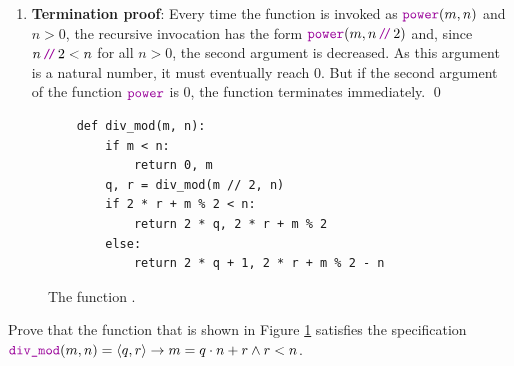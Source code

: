 \begin{enumerate}
\begin{enumerate}
            Then there exists a number $k \in \N$ such that $n = 2 \cdot k + 1$ and we have
            $n \dv 2 = k$.  In this case we have:
            \\[0.2cm]
            \hspace*{1.3cm}
            $ 
            \begin{array}{lcl}
            \mytt{power}(m,n) & = & \mytt{power}(m,k) \cdot \mytt{power}(m,k) \cdot m  \\[0.2cm]
                                & \stackrel{\mathrm{i.h.}}{=} & m^k \cdot m^k \cdot m  \\[0.2cm]
                                & = & m^{2\cdot k+1} \\[0.2cm]
                                & = & m^{n}.
            \end{array}
            $
      \end{enumerate}
      As we have shown that $\mytt{power}(m,n) = m^n$ in both cases, the induction step is finished. \mycheck
\item \textbf{Termination proof}:
      Every time the function  is invoked as $\mytt{power}(m, n)$ and $n > 0$, the recursive
      invocation has the form $\mytt{power}(m,n \dv 2)$ and, since $n \dv 2 < n$ for all $n > 0$, the second
      argument is decreased.  As this argument is a natural number, it must eventually reach $0$.  But if the
      second argument of the function $\mytt{power}$ is $0$, the function terminates immediately. \mycheck
      \qed
\end{enumerate}

\begin{figure}[!h]
  \centering
\begin{verbatim}
    def div_mod(m, n):
        if m < n:
            return 0, m
        q, r = div_mod(m // 2, n)
        if 2 * r + m % 2 < n:
            return 2 * q, 2 * r + m % 2
        else:
            return 2 * q + 1, 2 * r + m % 2 - n                
\end{verbatim}
\vspace*{-0.3cm}
  \caption{The function .}
  \label{fig:div_mod}
\end{figure} 

\exercise
Prove that the function  that is shown in Figure \ref{fig:div_mod} satisfies the specification
\\[0.2cm]
\hspace*{1.3cm}
$\mytt{div\_mod}(m, n) = \langle q, r \rangle \rightarrow m = q \cdot n + r \wedge r < n$. \eoxs


